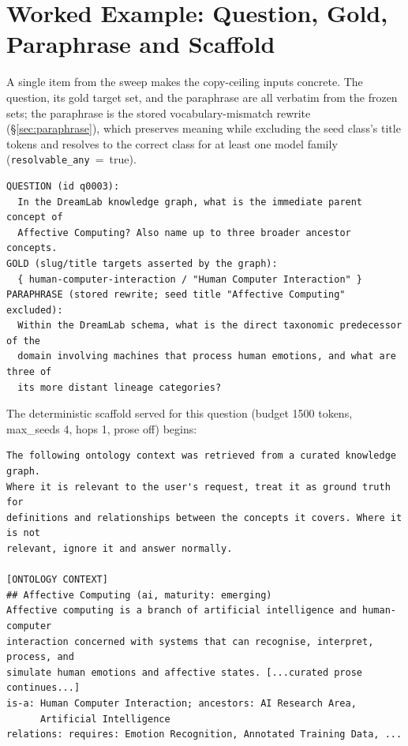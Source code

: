 \documentclass[10pt,twocolumn]{article}
\begin{document}
\section{Worked Example: Question, Gold, Paraphrase and Scaffold}\label{sec:appendix-samples}
A single item from the sweep makes the copy-ceiling inputs concrete. The question, its gold
target set, and the paraphrase are all verbatim from the frozen sets; the paraphrase is the
stored vocabulary-mismatch rewrite (\S\ref{sec:paraphrase}), which preserves meaning while
excluding the seed class's title tokens and resolves to the correct class for at least one
model family (\texttt{resolvable\_any}~=~true).

{\footnotesize\begin{verbatim}
QUESTION (id q0003):
  In the DreamLab knowledge graph, what is the immediate parent concept of
  Affective Computing? Also name up to three broader ancestor concepts.
GOLD (slug/title targets asserted by the graph):
  { human-computer-interaction / "Human Computer Interaction" }
PARAPHRASE (stored rewrite; seed title "Affective Computing" excluded):
  Within the DreamLab schema, what is the direct taxonomic predecessor of the
  domain involving machines that process human emotions, and what are three of
  its more distant lineage categories?
\end{verbatim}}

\noindent The deterministic scaffold served for this question (budget 1500 tokens, max\_seeds 4,
hops 1, prose off) begins:

{\footnotesize\begin{verbatim}
The following ontology context was retrieved from a curated knowledge graph.
Where it is relevant to the user's request, treat it as ground truth for
definitions and relationships between the concepts it covers. Where it is not
relevant, ignore it and answer normally.

[ONTOLOGY CONTEXT]
## Affective Computing (ai, maturity: emerging)
Affective computing is a branch of artificial intelligence and human-computer
interaction concerned with systems that can recognise, interpret, process, and
simulate human emotions and affective states. [...curated prose continues...]
is-a: Human Computer Interaction; ancestors: AI Research Area,
      Artificial Intelligence
relations: requires: Emotion Recognition, Annotated Training Data, ...
\end{verbatim}}
\end{document}

